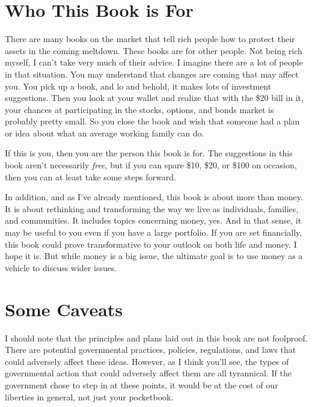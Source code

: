 \documentclass[letterpaper]{article}
\begin{document}
\section{Who This Book is For}
{\color{black}
There are many books on the market that tell rich people how to protect
their assets in the coming meltdown. These books are for other people.
Not being rich
\textcolor[rgb]{0.32941177,0.5529412,0.83137256}{myself}, I can’t take
very much of their advice. I imagine there are a lot of people in that
situation. You may understand that changes are coming that may affect
you. You pick up a book, and lo and behold, it makes lots of investment
suggestions. Then you look at your wallet and realize that with the
\$20 bill in it, your chances at participating in the stocks, options,
and bonds market is probably pretty small. So you close the book and
wish that someone had a plan or idea about what an average working
family can do.}

{\color{black}
If this is you, then you are the person this book is for. The
suggestions in this book aren’t necessarily \textit{free}, but if you
can spare \$10, \$20, or \$100 on occasion, then you can at least take
some steps forward.}

{\color{black}
In addition, \textcolor[rgb]{0.32941177,0.5529412,0.83137256}{and}
\textcolor[rgb]{0.32941177,0.5529412,0.83137256}{as I’ve already
mentioned, }this book is about more than money. It is about rethinking
and transforming the way we live as individuals, families, and
communities. It includes topics concerning money, yes. And in that
sense, it may be useful to you even if you have a large portfolio. If
you are set financially, this book could prove transformative to your
outlook on both life and money.
\textcolor[rgb]{0.32941177,0.5529412,0.83137256}{I hope it is. But
w}hile money is a big issue, the ultimate goal is to use money as a
vehicle to discuss wider issues. }

\section[Some Caveats]{Some Caveats}
{\color{black}
I should note that the principles and plans laid out in this book are
not foolproof. There are potential governmental practices, policies,
regulations, and laws that could adversely affect these ideas. However,
as I think you’ll see, the types of governmental action that could
adversely affect them are all tyrannical. If the government chose to
step in at these points, it would be at the cost of our liberties in
general, not just your pocketbook. }
\end{document}

